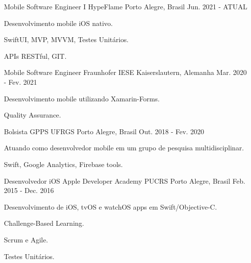 

\begin{cventries}

  \cventry
    {Mobile Software Engineer I} %
    {HypeFlame} %
    {Porto Alegre, Brasil} %
    {Jun. 2021 - ATUAL} %
    {
      \begin{cvitems} %
        \item {Desenvolvimento mobile iOS nativo.}
        \item {SwiftUI, MVP, MVVM, Testes Unitários.}
         \item {APIs RESTful, GIT.}
      \end{cvitems}
    }

  \cventry
    {Mobile Software Engineer} %
    {Fraunhofer IESE} %
    {Kaiserslautern, Alemanha} %
    {Mar. 2020 - Fev. 2021} %
    {
      \begin{cvitems} %
        \item {Desenvolvimento mobile utilizando Xamarin-Forms.}
        \item {Quality Assurance.}
      \end{cvitems}
    }

  \cventry
    {Bolsista} %
    {GPPS UFRGS} %
    {Porto Alegre, Brasil} %
    {Out. 2018 - Fev. 2020} %
    {
      \begin{cvitems} %
        \item {Atuando como desenvolvedor mobile em um grupo de pesquisa multidisciplinar.}
        \item {Swift, Google Analytics, Firebase tools.}
        \end{cvitems}
    }

  \cventry
    {Desenvolvedor iOS} %
    {Apple Developer Academy PUCRS} %
    {Porto Alegre, Brasil} %
    {Feb. 2015 - Dec. 2016} %
    {
      \begin{cvitems} %
        \item {Desenvolvimento de iOS, tvOS e watchOS apps em Swift/Objective-C.}
      \item {Challenge-Based Learning.}
      \item {Scrum e Agile.}
      \item {Testes Unitários.}
      \end{cvitems}
    }

\end{cventries}
